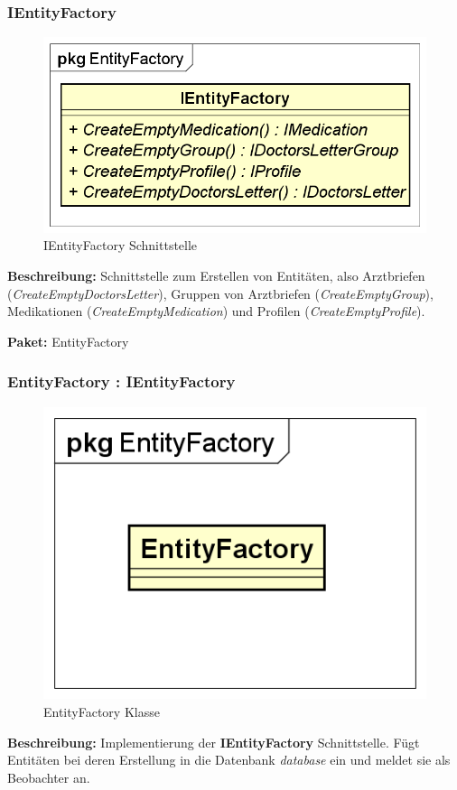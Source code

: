 \documentclass[a4paper]{scrreprt}
\begin{document}
\subsubsection{IEntityFactory}
\begin{figure}[H]
\centering
\includegraphics[width=0.75\textheight]{graphics/Klassendiagramme/Model/IEntityFactory.png}
\caption{IEntityFactory Schnittstelle}
\end{figure}
\textbf{Beschreibung:} Schnittstelle zum Erstellen von Entitäten, also Arztbriefen (\textit{CreateEmptyDoctorsLetter}), Gruppen von Arztbriefen (\textit{CreateEmptyGroup}), Medikationen (\textit{CreateEmptyMedication}) und Profilen (\textit{CreateEmptyProfile}).

\textbf{Paket:} EntityFactory

\subsubsection{EntityFactory : IEntityFactory}
\begin{figure}[H]
\centering
\includegraphics[width=0.75\textheight]{graphics/Klassendiagramme/Model/EntityFactory.png}
\caption{EntityFactory Klasse}
\end{figure}
\textbf{Beschreibung:} Implementierung der \textbf{IEntityFactory} Schnittstelle. Fügt Entitäten bei deren Erstellung in die Datenbank \textit{database} ein und meldet sie als Beobachter an.
\end{document}
